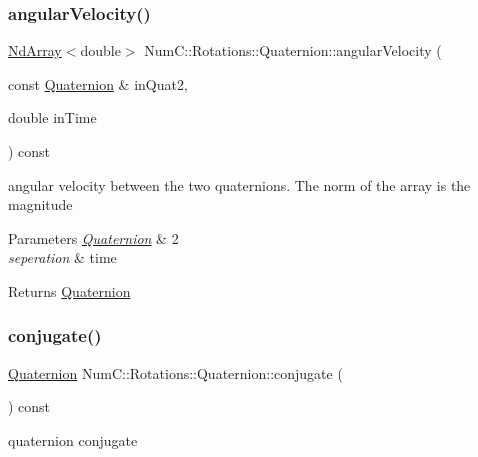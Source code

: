 \subsubsection{\texorpdfstring{angular\+Velocity()}{angularVelocity()}\hspace{0.1cm}{\footnotesize\ttfamily [2/2]}}
{\footnotesize\ttfamily \mbox{\hyperlink{class_num_c_1_1_nd_array}{Nd\+Array}}$<$double$>$ Num\+C\+::\+Rotations\+::\+Quaternion\+::angular\+Velocity (\begin{DoxyParamCaption}\item[{const \mbox{\hyperlink{class_num_c_1_1_rotations_1_1_quaternion}{Quaternion}} \&}]{in\+Quat2,  }\item[{double}]{in\+Time }\end{DoxyParamCaption}) const\hspace{0.3cm}{\ttfamily [inline]}}

angular velocity between the two quaternions. The norm of the array is the magnitude


\begin{DoxyParams}{Parameters}
{\em \mbox{\hyperlink{class_num_c_1_1_rotations_1_1_quaternion}{Quaternion}}} & 2 \\
\hline
{\em seperation} & time \\
\hline
\end{DoxyParams}
\begin{DoxyReturn}{Returns}
\mbox{\hyperlink{class_num_c_1_1_rotations_1_1_quaternion}{Quaternion}} 
\end{DoxyReturn}
\mbox{\label{class_num_c_1_1_rotations_1_1_quaternion_a23ff5925a91c1131a78935f8628edaed}} 
\subsubsection{\texorpdfstring{conjugate()}{conjugate()}}
{\footnotesize\ttfamily \mbox{\hyperlink{class_num_c_1_1_rotations_1_1_quaternion}{Quaternion}} Num\+C\+::\+Rotations\+::\+Quaternion\+::conjugate (\begin{DoxyParamCaption}{ }\end{DoxyParamCaption}) const\hspace{0.3cm}{\ttfamily [inline]}}

quaternion conjugate


